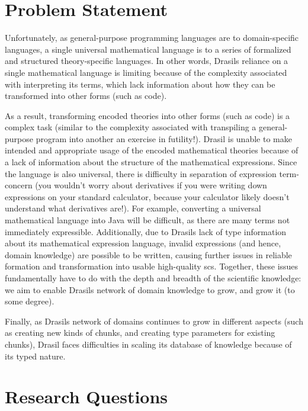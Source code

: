 \section{Problem Statement}
\label{sec:intro:problemStatement}


Unfortunately, as general-purpose programming languages are to domain-specific
languages, a single universal mathematical language is to a series of formalized
and structured theory-specific languages. In other words, Drasils reliance on a
single mathematical language is limiting because of the complexity associated
with interpreting its terms, which lack information about how they can be
transformed into other forms (such as code).

As a result, transforming encoded theories into other forms (such as code) is a
complex task (similar to the complexity associated with transpiling a
general-purpose program into another \textemdash{} an exercise in futility!). Drasil is
unable to make intended and appropriate usage of the encoded mathematical
theories because of a lack of information about the structure of the
mathematical expressions. Since the language is also universal, there is
difficulty in separation of expression term-concern (you wouldn't worry about
derivatives if you were writing down expressions on your standard calculator,
because your calculator likely doesn't understand what derivatives are!). For
example, converting a universal mathematical language into Java will be
difficult, as there are many terms not immediately expressible. Additionally,
due to Drasils lack of type information about its mathematical expression
language, invalid expressions (and hence, domain knowledge) are possible to be
written, causing further issues in reliable formation and transformation into
usable high-quality \acs{scs}. Together, these issues fundamentally have to do
with the depth and breadth of the scientific knowledge: we aim to enable Drasils
network of domain knowledge to grow, and grow it (to some degree).

Finally, as Drasils network of domains continues to grow in different aspects
(such as creating new kinds of chunks, and creating type parameters for existing
chunks), Drasil faces difficulties in scaling its database of knowledge because
of its typed nature.

\section{Research Questions}
\label{sec:intro:researchquestions}

